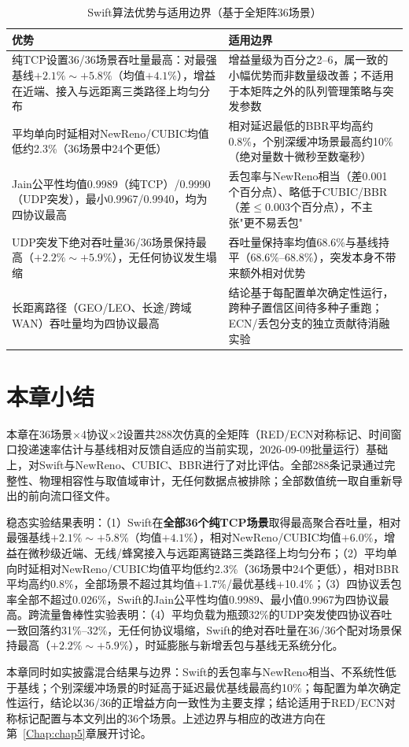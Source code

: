 \begin{table}[htbp]
\centering
\caption{Swift算法优势与适用边界（基于全矩阵36场景）}
\label{tab:pros_cons}
\small
\begin{tabular}{|p{6.4cm}|p{6.4cm}|}
\hline
\textbf{优势} & \textbf{适用边界} \\
\hline
纯TCP设置36/36场景吞吐量最高：对最强基线$+2.1\%\sim+5.8\%$（均值$+4.1\%$），增益在近端、接入与远距离三类路径上均匀分布 & 增益量级为百分之2--6，属一致的小幅优势而非数量级改善；不适用于本矩阵之外的队列管理策略与突发参数 \\
平均单向时延相对NewReno/CUBIC均值低约2.3\%（36场景中24个更低） & 相对延迟最低的BBR平均高约0.8\%，个别深缓冲场景最高约10\%（绝对量数十微秒至数毫秒） \\
Jain公平性均值0.9989（纯TCP）/0.9990（UDP突发），最小0.9967/0.9940，均为四协议最高 & 丢包率与NewReno相当（差0.001个百分点）、略低于CUBIC/BBR（差$\leq$0.003个百分点），不主张"更不易丢包" \\
UDP突发下绝对吞吐量36/36场景保持最高（$+2.2\%\sim+5.9\%$），无任何协议发生塌缩 & 吞吐量保持率均值68.6\%与基线持平（68.6\%--68.8\%），突发本身不带来额外相对优势 \\
长距离路径（GEO/LEO、长途/跨域WAN）吞吐量均为四协议最高 & 结论基于每配置单次确定性运行，跨种子置信区间待多种子重跑；ECN/丢包分支的独立贡献待消融实验 \\
\hline
\end{tabular}
\end{table}

\section{本章小结}

本章在36场景$\times$4协议$\times$2设置共288次仿真的全矩阵（RED/ECN对称标记、时间窗口投递速率估计与基线相对反馈自适应的当前实现，2026-09-09批量运行）基础上，对Swift与NewReno、CUBIC、BBR进行了对比评估。全部288条记录通过完整性、物理相容性与取值域审计，无任何数据点被排除；全部数值统一取自重新导出的前向流口径文件。

稳态实验结果表明：（1）Swift在\textbf{全部36个纯TCP场景}取得最高聚合吞吐量，相对最强基线$+2.1\%\sim+5.8\%$（均值$+4.1\%$），相对NewReno/CUBIC均值$+6.0\%$，增益在微秒级近端、无线/蜂窝接入与远距离链路三类路径上均匀分布；（2）平均单向时延相对NewReno/CUBIC均值平均低约2.3\%（36场景中24个更低），相对BBR平均高约0.8\%，全部场景不超过其均值+1.7\%/最优基线+10.4\%；（3）四协议丢包率全部不超过0.026\%，Swift的Jain公平性均值0.9989、最小值0.9967为四协议最高。跨流量鲁棒性实验表明：（4）平均负载为瓶颈32\%的UDP突发使四协议吞吐一致回落约31\%--32\%，无任何协议塌缩，Swift的绝对吞吐量在36/36个配对场景保持最高（$+2.2\%\sim+5.9\%$），时延膨胀与新增丢包与基线无系统分化。

本章同时如实披露混合结果与边界：Swift的丢包率与NewReno相当、不系统性低于基线；个别深缓冲场景的时延高于延迟最优基线最高约10\%；每配置为单次确定性运行，结论以36/36的正增益方向一致性为主要支撑；结论适用于RED/ECN对称标记配置与本文列出的36个场景。上述边界与相应的改进方向在第~\ref{Chap:chap5}章展开讨论。
